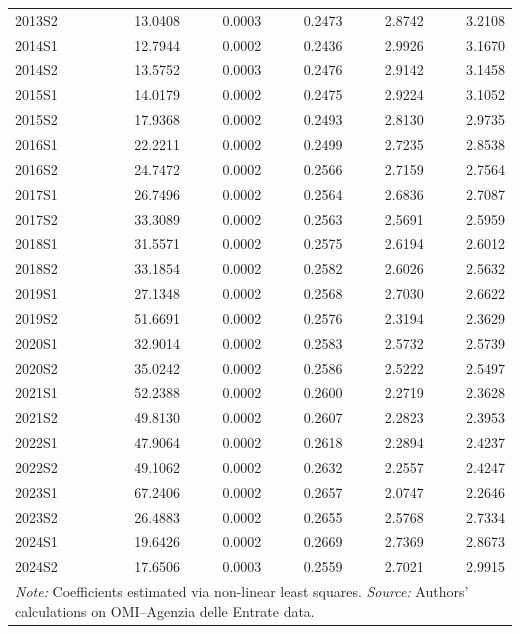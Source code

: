 \begin{landscape}
\begin{table}[!ht]
\begin{tabular}{lrrrrr}
    2013S2 & 13.0408 & 0.0003 & 0.2473 & 2.8742 & 3.2108 \\
    2014S1 & 12.7944 & 0.0002 & 0.2436 & 2.9926 & 3.1670 \\
    2014S2 & 13.5752 & 0.0003 & 0.2476 & 2.9142 & 3.1458 \\
    2015S1 & 14.0179 & 0.0002 & 0.2475 & 2.9224 & 3.1052 \\
    2015S2 & 17.9368 & 0.0002 & 0.2493 & 2.8130 & 2.9735 \\
    2016S1 & 22.2211 & 0.0002 & 0.2499 & 2.7235 & 2.8538 \\
    2016S2 & 24.7472 & 0.0002 & 0.2566 & 2.7159 & 2.7564 \\
    2017S1 & 26.7496 & 0.0002 & 0.2564 & 2.6836 & 2.7087 \\
    2017S2 & 33.3089 & 0.0002 & 0.2563 & 2.5691 & 2.5959 \\
    2018S1 & 31.5571 & 0.0002 & 0.2575 & 2.6194 & 2.6012 \\
    2018S2 & 33.1854 & 0.0002 & 0.2582 & 2.6026 & 2.5632 \\
    2019S1 & 27.1348 & 0.0002 & 0.2568 & 2.7030 & 2.6622 \\
    2019S2 & 51.6691 & 0.0002 & 0.2576 & 2.3194 & 2.3629 \\
    2020S1 & 32.9014 & 0.0002 & 0.2583 & 2.5732 & 2.5739 \\
    2020S2 & 35.0242 & 0.0002 & 0.2586 & 2.5222 & 2.5497 \\
    2021S1 & 52.2388 & 0.0002 & 0.2600 & 2.2719 & 2.3628 \\
    2021S2 & 49.8130 & 0.0002 & 0.2607 & 2.2823 & 2.3953 \\
    2022S1 & 47.9064 & 0.0002 & 0.2618 & 2.2894 & 2.4237 \\
    2022S2 & 49.1062 & 0.0002 & 0.2632 & 2.2557 & 2.4247 \\
    2023S1 & 67.2406 & 0.0002 & 0.2657 & 2.0747 & 2.2646 \\
    2023S2 & 26.4883 & 0.0002 & 0.2655 & 2.5768 & 2.7334 \\
    2024S1 & 19.6426 & 0.0002 & 0.2669 & 2.7369 & 2.8673 \\
    2024S2 & 17.6506 & 0.0003 & 0.2559 & 2.7021 & 2.9915 \\
    \hline
    \multicolumn{6}{l}{\textit{Note:} Coefficients estimated via non-linear least squares. \textit{Source:} Authors' calculations on OMI--Agenzia delle Entrate data.} \\
  \end{tabular}
\end{table}
\end{landscape}

